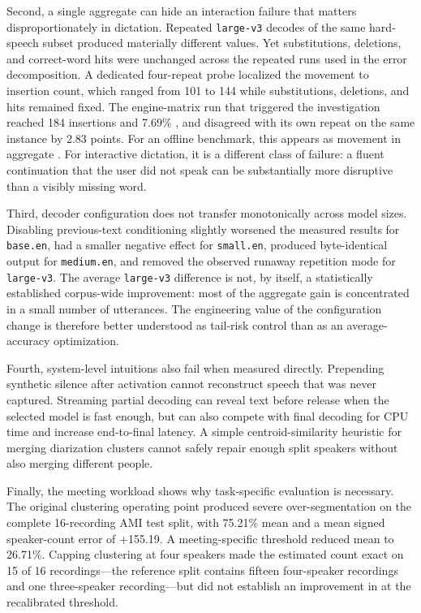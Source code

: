 Second, a single aggregate \wer{} can hide an interaction failure that matters disproportionately
in dictation. Repeated \texttt{large-v3} decodes of the same hard-speech subset produced
materially different \wer{} values. Yet substitutions, deletions, and correct-word hits were
unchanged across the repeated runs used in the error decomposition. A dedicated four-repeat probe localized the movement to insertion count, which ranged from
101 to 144 while substitutions, deletions, and hits remained fixed. The engine-matrix run that
triggered the investigation reached 184 insertions and 7.69\% \wer{}, and disagreed with its own
repeat on the same instance by 2.83 \wer{} points. For an offline benchmark, this appears as
movement in aggregate \wer{}. For interactive dictation, it is a different class of failure: a
fluent
continuation that the user did not speak can be substantially more disruptive than a visibly
missing word.

Third, decoder configuration does not transfer monotonically across model sizes. Disabling
previous-text conditioning slightly worsened the measured results for \texttt{base.en}, had a
smaller negative effect for \texttt{small.en}, produced byte-identical output for
\texttt{medium.en}, and removed the observed runaway repetition mode for \texttt{large-v3}. The
average \texttt{large-v3} \wer{} difference is not, by itself, a statistically established
corpus-wide improvement: most of the aggregate gain is concentrated in a small number of
utterances. The engineering value of the configuration change is therefore better understood as
tail-risk control than as an average-accuracy optimization.

Fourth, system-level intuitions also fail when measured directly. Prepending synthetic silence
after activation cannot reconstruct speech that was never captured. Streaming partial decoding
can reveal text before release when the selected model is fast enough, but can also compete with
final decoding for CPU time and increase end-to-final latency. A simple centroid-similarity
heuristic for merging diarization clusters cannot safely repair enough split speakers without
also merging different people.

Finally, the meeting workload shows why task-specific evaluation is necessary. The original
clustering operating point produced severe over-segmentation on the complete 16-recording AMI
test split, with 75.21\% mean \der{} and a mean signed speaker-count error of +155.19.
A meeting-specific threshold reduced mean \der{} to 26.71\%. Capping clustering at four
speakers made the estimated count exact on 15 of 16 recordings---the reference split contains
fifteen four-speaker recordings and one three-speaker recording---but did not establish an
improvement in \der{} at the recalibrated threshold.

